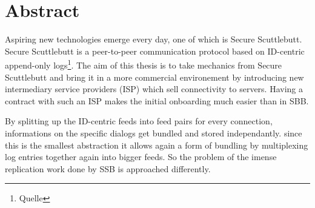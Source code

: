 \chapter{Abstract}
Aspiring new technologies emerge every day, one of which is Secure Scuttlebutt. Secure Scuttlebutt is a peer-to-peer communication protocol based on ID-centric append-only logs\footnote{Quelle}. The aim of this thesis is to take mechanics from Secure Scuttlebutt and bring it in a more commercial environement by introducing new intermediary service providers (ISP) which sell connectivity to servers. Having a contract with such an ISP makes the initial onboarding much easier than in SBB. 

By splitting up the ID-centric feeds into feed pairs for every connection, informations on the specific dialogs get bundled and stored independantly. since this is the smallest abstraction it allows again a form of bundling by multiplexing log entries together again into bigger feeds. So the problem of the imense replication work done by SSB is approached differently. 

